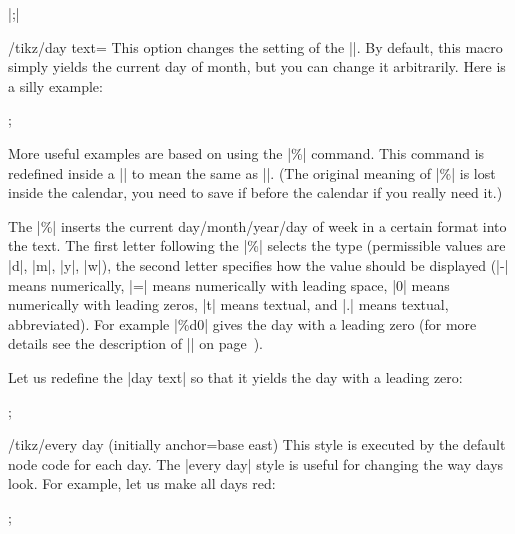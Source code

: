 \begin{command}{\calendar {}|;|}
    \begin{key}{/tikz/day text=}
        This option changes the setting of the |\tikzdaytext|. By default, this
        macro simply yields the current day of month, but you can change it
        arbitrarily. Here is a silly example:
\begin{codeexample}[preamble={\usetikzlibrary{calendar}}]
\tikz \calendar[dates=2000-01-01 to 2000-01-31,week list,
                day text=x];
\end{codeexample}
        More useful examples are based on using the |\%| command. This command
        is redefined inside a |\pgfcalendar| to mean the same as
        |\pgfcalendarshorthand|. (The original meaning of |\%| is lost inside
        the calendar, you need to save if before the calendar if you really
        need it.)

        The |\%| inserts the current day/month/year/day of week in a certain
        format into the text. The first letter following the |\%| selects the
        type (permissible values are |d|, |m|, |y|, |w|), the second letter
        specifies how the value should be displayed (|-| means numerically, |=|
        means numerically with leading space, |0| means numerically with
        leading zeros, |t| means textual, and |.| means textual, abbreviated).
        For example |\%d0| gives the day with a leading zero (for more details
        see the description of |\pgfcalendarshorthand| on
        page~\pageref{pgfcalendarshorthand}).

        Let us redefine the |day text| so that it yields the day with a leading
        zero:
\begin{codeexample}[leave comments,preamble={\usetikzlibrary{calendar}}]
\tikz \calendar[dates=2000-01-01 to 2000-01-31,week list,
                day text=\%d0];
\end{codeexample}
    \end{key}

    \begin{stylekey}{/tikz/every day (initially anchor=base east)}
        This style is executed by the default node code for each day. The
        |every day| style is useful for changing the way days look. For
        example, let us make all days red:
\begin{codeexample}[leave comments,preamble={\usetikzlibrary{calendar}}]
\tikz[every day/.style=red]
  \calendar[dates=2000-01-01 to 2000-01-31,week list];
\end{codeexample}
    \end{stylekey}



\end{command}

